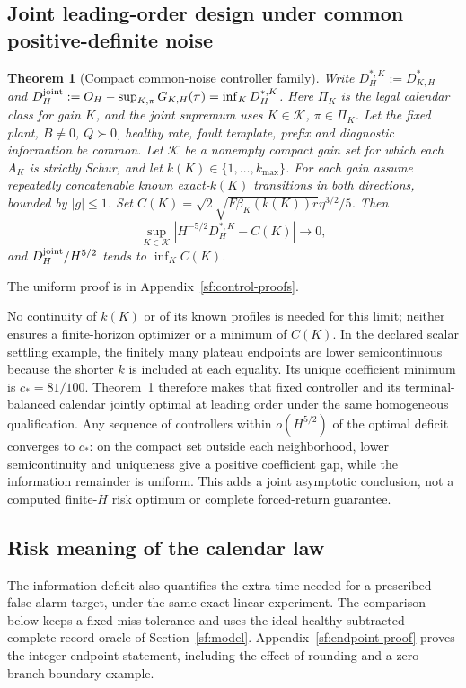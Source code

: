 \documentclass[journal]{IEEEtran}
\newtheorem{theorem}{Theorem}
\begin{document}
\subsection{Joint leading-order design under common positive-definite noise}
\begin{theorem}[Compact common-noise controller family]\label{sf:uniform}
Write $D_H^{*,K}:=D_{K,H}^*$ and
$D_H^{\rm joint}:=O_H-\sup_{K,\pi}G_{K,H}(\pi)=\inf_KD_H^{*,K}$.
Here $\Pi_K$ is the legal calendar class for gain $K$, and the joint supremum
uses $K\in\mathcal K$, $\pi\in\Pi_K$. Let the fixed plant, $B\ne0$,
$Q\succ0$, healthy rate, fault template,
prefix and diagnostic information be common. Let $\mathcal K$ be a nonempty
compact gain set for which each $A_K$ is strictly Schur, and let
$k(K)\in\{1,\ldots,k_{\max}\}$. For each gain assume repeatedly concatenable
known exact-$k(K)$ transitions in both directions, bounded by $|g|\le1$.
Set $C(K)=\sqrt2\sqrt{F\beta_K(k(K))r}\eta^{3/2}/5$. Then
\[
\sup_{K\in\mathcal K}|H^{-5/2}D_H^{*,K}-C(K)|\longrightarrow0,
\]
and $D_H^{\rm joint}/H^{5/2}$ tends to $\inf_K C(K)$.
\end{theorem}
The uniform proof is in Appendix~\ref{sf:control-proofs}.

No continuity of $k(K)$ or of its known profiles is needed for this limit;
neither ensures a finite-horizon optimizer or a minimum of $C(K)$.
In the declared scalar settling example, the finitely many plateau endpoints
are lower semicontinuous because the shorter $k$ is included at each equality.
Its unique coefficient minimum is $c_*=81/100$.
Theorem~\ref{sf:uniform} therefore makes that fixed controller and its
terminal-balanced calendar jointly optimal at leading order under the same
homogeneous qualification. Any sequence of controllers within
$o(H^{5/2})$ of the optimal deficit converges to $c_*$: on the compact set
outside each neighborhood, lower semicontinuity and uniqueness give a positive
coefficient gap, while the information remainder is uniform.
This adds a joint asymptotic conclusion, not a computed finite-$H$ risk optimum
or complete forced-return guarantee.

\subsection{Risk meaning of the calendar law}\label{sf:fixed-endpoint-risk}
The information deficit also quantifies the extra time needed for a
prescribed false-alarm target, under the same exact linear experiment.
The comparison below keeps a fixed miss tolerance and uses the ideal
healthy-subtracted complete-record oracle of Section~\ref{sf:model}.
Appendix~\ref{sf:endpoint-proof} proves the integer endpoint statement,
including the effect of rounding and a zero-branch boundary example.
\end{document}
